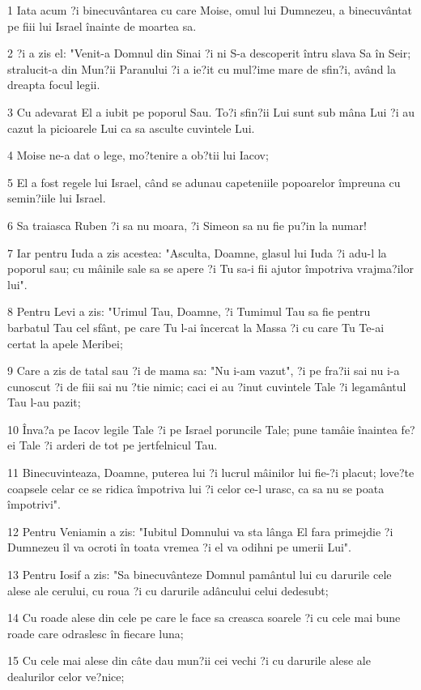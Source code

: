 \par 1 Iata acum ?i binecuvântarea cu care Moise, omul lui Dumnezeu, a binecuvântat pe fiii lui Israel înainte de moartea sa.
\par 2 ?i a zis el: "Venit-a Domnul din Sinai ?i ni S-a descoperit întru slava Sa în Seir; stralucit-a din Mun?ii Paranului ?i a ie?it cu mul?ime mare de sfin?i, având la dreapta focul legii.
\par 3 Cu adevarat El a iubit pe poporul Sau. To?i sfin?ii Lui sunt sub mâna Lui ?i au cazut la picioarele Lui ca sa asculte cuvintele Lui.
\par 4 Moise ne-a dat o lege, mo?tenire a ob?tii lui Iacov;
\par 5 El a fost regele lui Israel, când se adunau capeteniile popoarelor împreuna cu semin?iile lui Israel.
\par 6 Sa traiasca Ruben ?i sa nu moara, ?i Simeon sa nu fie pu?in la numar!
\par 7 Iar pentru Iuda a zis acestea: "Asculta, Doamne, glasul lui Iuda ?i adu-l la poporul sau; cu mâinile sale sa se apere ?i Tu sa-i fii ajutor împotriva vrajma?ilor lui".
\par 8 Pentru Levi a zis: "Urimul Tau, Doamne, ?i Tumimul Tau sa fie pentru barbatul Tau cel sfânt, pe care Tu l-ai încercat la Massa ?i cu care Tu Te-ai certat la apele Meribei;
\par 9 Care a zis de tatal sau ?i de mama sa: "Nu i-am vazut", ?i pe fra?ii sai nu i-a cunoscut ?i de fiii sai nu ?tie nimic; caci ei au ?inut cuvintele Tale ?i legamântul Tau l-au pazit;
\par 10 Înva?a pe Iacov legile Tale ?i pe Israel poruncile Tale; pune tamâie înaintea fe?ei Tale ?i arderi de tot pe jertfelnicul Tau.
\par 11 Binecuvinteaza, Doamne, puterea lui ?i lucrul mâinilor lui fie-?i placut; love?te coapsele celar ce se ridica împotriva lui ?i celor ce-l urasc, ca sa nu se poata împotrivi".
\par 12 Pentru Veniamin a zis: "Iubitul Domnului va sta lânga El fara primejdie ?i Dumnezeu îl va ocroti în toata vremea ?i el va odihni pe umerii Lui".
\par 13 Pentru Iosif a zis: "Sa binecuvânteze Domnul pamântul lui cu darurile cele alese ale cerului, cu roua ?i cu darurile adâncului celui dedesubt;
\par 14 Cu roade alese din cele pe care le face sa creasca soarele ?i cu cele mai bune roade care odraslesc în fiecare luna;
\par 15 Cu cele mai alese din câte dau mun?ii cei vechi ?i cu darurile alese ale dealurilor celor ve?nice;
